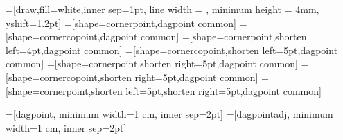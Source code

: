 
\makeatother



=[draw,fill=white,inner sep=1pt, line width = \maplw, minimum height = 4mm, yshift=1.2pt] %
=[shape=cornerpoint,dagpoint common]
=[shape=cornercopoint,dagpoint common]
=[shape=cornerpoint,shorten left=4pt,dagpoint common]
=[shape=cornercopoint,shorten left=5pt,dagpoint common]
=[shape=cornerpoint,shorten right=5pt,dagpoint common]
=[shape=cornercopoint,shorten right=5pt,dagpoint common]
=[shape=cornerpoint,shorten left=5pt,shorten right=5pt,dagpoint common]

=[dagpoint, minimum width=1 cm, inner sep=2pt]%
=[dagpointadj, minimum width=1 cm, inner sep=2pt]%

